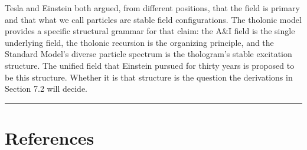 \documentclass[12pt]{article}
\begin{document}
Tesla and Einstein both argued, from different positions, that the field
is primary and that what we call particles are stable field
configurations. The tholonic model provides a specific structural
grammar for that claim: the A\(\&\)I field is the single underlying
field, the tholonic recursion is the organizing principle, and the
Standard Model's diverse particle spectrum is the thologram's stable
excitation structure. The unified field that Einstein pursued for thirty
years is proposed to be this structure. Whether it is that structure is
the question the derivations in Section 7.2 will decide.

\begin{center}\rule{0.5\linewidth}{0.5pt}\end{center}

\section{References}\label{references-and-source-materials}
\end{document}

